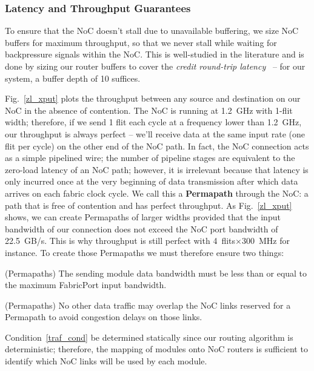 %
\subsubsection{Latency and Throughput Guarantees}
\label{subsec_guarantees}
%


To ensure that the NoC doesn't stall due to unavailable buffering, we size NoC buffers for maximum throughput, so that we never stall while waiting for backpressure signals within the NoC.
This is well-studied in the literature and is done by sizing our router buffers to cover the \textit{credit round-trip latency}~\cite{dally_book} -- for our system, a buffer depth of 10 suffices.



Fig.~\ref{zl_xput} plots the throughput between any source and destination on our NoC in the absence of contention.
The NoC is running at 1.2~GHz with 1-flit width; therefore, if we send 1 flit each cycle at a frequency lower than 1.2~GHz, our throughput is always perfect -- we'll receive data at the same input rate (one flit per cycle) on the other end of the NoC path. 
In fact, the NoC connection acts as a simple pipelined wire; the number of pipeline stages are equivalent to the zero-load latency of an NoC path; however, it is irrelevant because that latency is only incurred once at the very beginning of data transmission after which data arrives on each fabric clock cycle.
We call this a \textbf{Permapath} through the NoC: a path that is free of contention and has perfect throughput.
As Fig.~\ref{zl_xput} shows, we can create Permapaths of larger widths provided that the input bandwidth of our connection does not exceed the NoC port bandwidth of 22.5~GB/s.
This is why throughput is still perfect with 4~flits$\times$300~MHz for instance.
To create those Permapaths we must therefore ensure two things:
%
\begin{cond}
(Permapaths)
The sending module data bandwidth must be less than or equal to the maximum FabricPort input bandwidth.
\end{cond}
%
\begin{cond}
\label{traf_cond}
(Permapaths)
No other data traffic may overlap the NoC links reserved for a Permapath to avoid congestion delays on those links.
\end{cond}
%
Condition~\ref{traf_cond} be determined statically since our routing algorithm is deterministic; therefore, the mapping of modules onto NoC routers is sufficient to identify which NoC links will be used by each module.


